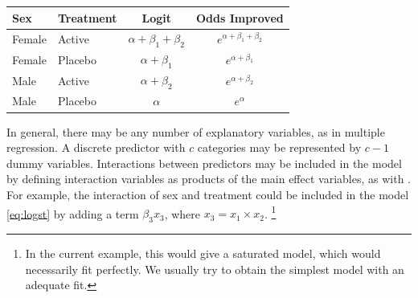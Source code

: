\begin{center}
\vspace{1ex}
{\renewcommand{\arraystretch}{1.2}
\begin{tabular}{|ll|cc|}
\hline
Sex  &  Treatment & Logit & Odds Improved  \\[.5ex] \hline

Female & Active & \(\alpha + \beta_1 + \beta_2\) & \(e^{\alpha + \beta_1 + \beta_2}\)  \\
Female & Placebo & \(\alpha + \beta_1 \) & \(e^{\alpha + \beta_1 }\) \\
Male   & Active  & \(\alpha + \beta_2 \) & \(e^{\alpha + \beta_2 }\) \\
Male  & Placebo  & \(\alpha \) & \(e^{\alpha}\) \\ \hline
\end{tabular}
}
\end{center}

In general, there may be any number of explanatory variables, as in multiple
regression.  A discrete predictor with $c$ categories may be represented
by  $c-1$ dummy variables.  Interactions between predictors may be included
in the model by defining interaction variables as products of the main effect variables, as with .
For example, the interaction of sex and treatment could be included in the
model \eqref{eq:logst} by adding a term
$\beta_3 x_3$, where $x_3 = x_1 \times x_2$.%
\footnote{In the current example, this would give a saturated model,  which would
necessarily fit perfectly.
We usually try to obtain the simplest model with an adequate fit.}

